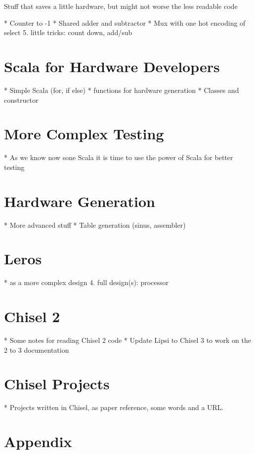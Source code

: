 \documentclass[%
    10pt, %
    headinclude, footexclude,
    openright, %
    notitlepage,
    cleardoubleempty,
    headsepline,
    pointlessnumbers,
    bibtotoc, idxtotoc,
    ]{scrbook}
\begin{document}
Stuff that saves a little hardware, but might not worse the less readable code

 * Counter to -1
 * Shared adder and subtractor
 * Mux with one hot encoding of select
 5. little tricks: count down, add/sub


\section{Scala for Hardware Developers}

 * Simple Scala (for, if else)
 * functions for hardware generation
 * Classes and constructor
 
 \section{More Complex Testing}
 
  * As we know now sone Scala it is time to use the power of Scala for better testing

\section{Hardware Generation}

 * More advanced stuff
 * Table generation (sinus, assembler)
 
 \section{Leros}
 
  * as a more complex design
  4. full design(s): processor

\section{Chisel 2}

 * Some notes for reading Chisel 2 code
 * Update Lipsi to Chisel 3 to work on the 2 to 3 documentation
 
 \section{Chisel Projects}
 
  * Projects written in Chisel, as paper reference, some words and a URL.

\section{Appendix}
\end{document}
